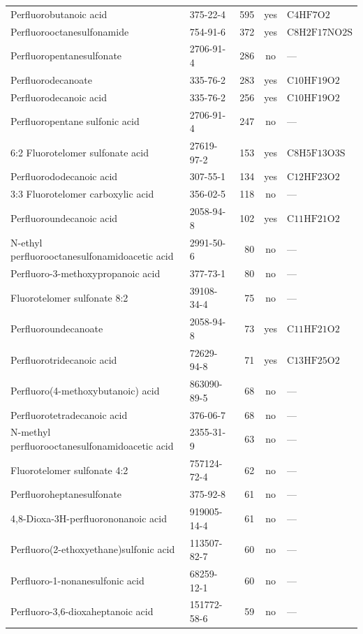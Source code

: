 \begin{longtable}{@{}p{66mm} l r c l@{}}
Perfluorobutanoic acid & 375-22-4 & 595 & yes & $\mathrm{C4HF7O2}$ \\
Perfluorooctanesulfonamide & 754-91-6 & 372 & yes & $\mathrm{C8H2F17NO2S}$ \\
Perfluoropentanesulfonate & 2706-91-4 & 286 & no & --- \\
Perfluorodecanoate & 335-76-2 & 283 & yes & $\mathrm{C10HF19O2}$ \\
Perfluorodecanoic acid & 335-76-2 & 256 & yes & $\mathrm{C10HF19O2}$ \\
Perfluoropentane sulfonic acid & 2706-91-4 & 247 & no & --- \\
6:2 Fluorotelomer sulfonate acid & 27619-97-2 & 153 & yes & $\mathrm{C8H5F13O3S}$ \\
Perfluorododecanoic acid & 307-55-1 & 134 & yes & $\mathrm{C12HF23O2}$ \\
3:3 Fluorotelomer carboxylic acid & 356-02-5 & 118 & no & --- \\
Perfluoroundecanoic acid & 2058-94-8 & 102 & yes & $\mathrm{C11HF21O2}$ \\
N-ethyl perfluorooctanesulfonamidoacetic acid & 2991-50-6 & 80 & no & --- \\
Perfluoro-3-methoxypropanoic acid & 377-73-1 & 80 & no & --- \\
Fluorotelomer sulfonate 8:2 & 39108-34-4 & 75 & no & --- \\
Perfluoroundecanoate & 2058-94-8 & 73 & yes & $\mathrm{C11HF21O2}$ \\
Perfluorotridecanoic acid & 72629-94-8 & 71 & yes & $\mathrm{C13HF25O2}$ \\
Perfluoro(4-methoxybutanoic) acid & 863090-89-5 & 68 & no & --- \\
Perfluorotetradecanoic acid & 376-06-7 & 68 & no & --- \\
N-methyl perfluorooctanesulfonamidoacetic acid & 2355-31-9 & 63 & no & --- \\
Fluorotelomer sulfonate 4:2 & 757124-72-4 & 62 & no & --- \\
Perfluoroheptanesulfonate & 375-92-8 & 61 & no & --- \\
4,8-Dioxa-3H-perfluorononanoic acid & 919005-14-4 & 61 & no & --- \\
Perfluoro(2-ethoxyethane)sulfonic acid & 113507-82-7 & 60 & no & --- \\
Perfluoro-1-nonanesulfonic acid & 68259-12-1 & 60 & no & --- \\
Perfluoro-3,6-dioxaheptanoic acid & 151772-58-6 & 59 & no & --- \\

\end{longtable}
